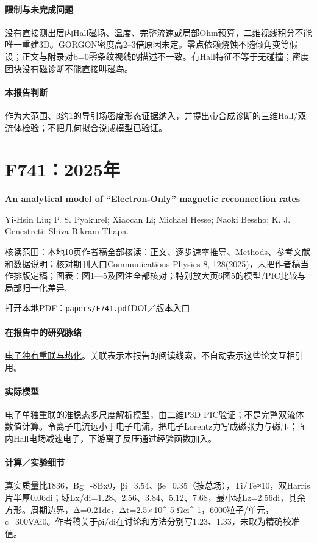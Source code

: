 \documentclass[UTF8,a4paper,11pt,openany,fontset=fandol]{ctexbook}
\begin{document}
\paragraph{限制与未完成问题}没有直接测出层内Hall磁场、温度、完整流速或局部Ohm预算，二维视线积分不能唯一重建3D。GORGON密度高2–3倍原因未定。零点依赖烧蚀不随倾角变等假设；正文与附录对b=0零条纹视线的描述不一致。有Hall特征不等于无碰撞；密度团块没有磁诊断不能直接叫磁岛。

\paragraph{本报告判断}作为大范围、β约1的导引场密度形态证据纳入，并提出带合成诊断的三维Hall/双流体检验；不把几何拟合说成模型已验证。

\section{F741：2025年}\label{paper:F741}

\textbf{An analytical model of “Electron-Only” magnetic reconnection rates}\citep{F741}\

Yi‐Hsin Liu;  P. S. Pyakurel;  Xiaocan Li;  Michael Hesse;  Naoki Bessho;  K. J. Genestreti;  Shiva Bikram Thapa.

\textsf{核读范围：}本地10页作者稿全部核读：正文、逐步速率推导、Methods、参考文献和数据说明；核对期刊入口Communications Physics 8, 128(2025)，未把作者稿当作排版定稿；\textsf{图表：}图1—5及图注全部核对；特别放大页6图5的模型/PIC比较与局部归一化差异.

\href{run:../papers/F741.pdf}{打开本地PDF：\texttt{papers/F741.pdf}}\quad\href{https://doi.org/10.1038/s42005-025-02034-z}{DOI／版本入口}

\paragraph{在报告中的研究脉络}\hyperref[story:energy]{电子独有重联与热化}。关联表示本报告的阅读线索，不自动表示这些论文互相引用。

\paragraph{实际模型}电子单独重联的准稳态多尺度解析模型，由二维P3D PIC验证；不是完整双流体数值计算。令离子电流远小于电子电流，把电子Lorentz力写成磁张力与磁压；面内Hall电场减速电子，下游离子反压通过经验函数加入。

\paragraph{计算／实验细节}真实质量比1836，Bg=-8Bx0，βi=3.54、βe=0.35（按总场），Ti/Te≈10，双Harris片半厚0.06di；域Lx/di=1.28、2.56、3.84、5.12、7.68，最小域Lz=2.56di，其余方形。周期边界，Δ=0.21de，Δt=2.5×10\textasciicircum{}-5 Ωci\textasciicircum{}-1，6000粒子/单元，c=300VAi0。作者稿关于ρi/di在讨论和方法分别写1.23、1.33，未取为精确校准值。
\end{document}

